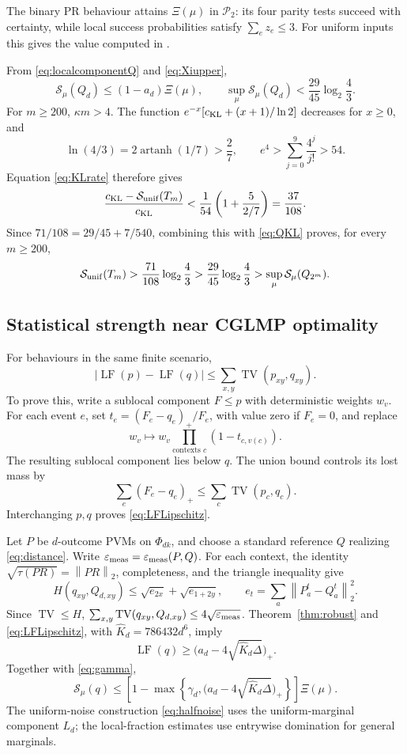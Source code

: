\documentclass[11pt]{amsart}
\theoremstyle{remark}
\theoremstyle{plain}
\numberwithin{equation}{section}
\DeclareMathOperator{\LF}{LF}
\DeclareMathOperator{\TV}{TV}
\DeclareMathOperator{\artanh}{artanh}
\newcommand{\NS}{\mathcal P}
\newcommand{\norm}[1]{\left\|#1\right\|}
\newcommand{\cKL}{c_{\rm KL}}
\newcommand{\epsmeas}{\varepsilon_{\rm meas}}
\begin{document}
The binary PR behaviour attains \(\Xi(\mu)\) in \(\NS_2\):
its four parity tests succeed with certainty, while local success
probabilities satisfy \(\sum_ez_e\le3\).
For uniform inputs this gives the value computed in \cite{Grudka}.

From \eqref{eq:localcomponentQ} and \eqref{eq:Xiupper},
\begin{equation}\label{eq:QKL}
 \mathcal S_\mu(Q_d)\le(1-a_d)\Xi(\mu),\qquad
 \sup_\mu\mathcal S_\mu(Q_d)<\frac{29}{45}\log_2\frac43.
\end{equation}
For \(m\ge200\), \(\kappa m>4\).
The function \(e^{-x}[\cKL+(x+1)/\ln2]\) decreases for \(x\ge0\), and
\[
 \ln(4/3)=2\artanh(1/7)>\frac27,\qquad
 e^4>\sum_{j=0}^9\frac{4^j}{j!}>54.
\]
Equation \eqref{eq:KLrate} therefore gives
\[
 \frac{\cKL-\mathcal S_{\rm unif}(T_m)}{\cKL}
 <\frac1{54}\left(1+\frac5{2/7}\right)=\frac{37}{108}.
\]
Since \(71/108=29/45+7/540\), combining this with \eqref{eq:QKL}
proves, for every \(m\ge200\),
\begin{equation}\label{eq:KLseparation}
 \mathcal S_{\rm unif}(T_m)>
 \frac{71}{108}\log_2\frac43>
 \frac{29}{45}\log_2\frac43>
 \sup_\mu\mathcal S_\mu(Q_{2^m}).
\end{equation}

\subsection{Statistical strength near CGLMP optimality}

For behaviours in the same finite scenario,
\begin{equation}\label{eq:LFLipschitz}
 |\LF(p)-\LF(q)|\le\sum_{x,y}\TV(p_{xy},q_{xy}).
\end{equation}
To prove this, write a sublocal component \(F\le p\) with deterministic
weights \(w_v\). For each event \(e\), set
\(t_e=(F_e-q_e)_+/F_e\), with value zero if \(F_e=0\), and replace
\[
 w_v\longmapsto
 w_v\prod_{\text{contexts }c}(1-t_{c,v(c)}).
\]
The resulting sublocal component lies below \(q\).
The union bound controls its lost mass by
\[
 \sum_e(F_e-q_e)_+\le\sum_c\TV(p_c,q_c).
\]
Interchanging \(p,q\) proves \eqref{eq:LFLipschitz}.

Let \(P\) be \(d\)-outcome PVMs on \(\Phi_{dk}\), and choose a standard
reference \(Q\) realizing \eqref{eq:distance}.
Write \(\epsmeas=\epsmeas(P,Q)\).
For each context, the identity
\(\sqrt{\tau(PR)}=\norm{PR}_2\), completeness, and the triangle
inequality give
\[
 H(q_{xy},Q_{d,xy})\le\sqrt{e_{2x}}+\sqrt{e_{1+2y}},
 \qquad e_t=\sum_a\norm{P^t_a-Q^t_a}_2^2.
\]
Since \(\TV\le H\),
\(\sum_{x,y}\TV(q_{xy},Q_{d,xy})\le4\sqrt{\epsmeas}\).
Theorem~\ref{thm:robust} and \eqref{eq:LFLipschitz}, with
\(\widehat K_d=786432d^6\), imply
\[
 \LF(q)\ge
 \bigl(a_d-4\sqrt{\widehat K_d\Delta}\bigr)_+.
\]
Together with \eqref{eq:gamma},
\begin{equation}\label{eq:KLtradeoff}
 \mathcal S_\mu(q)\le
 \left[
 1-\max\left\{\gamma_d,
       \bigl(a_d-4\sqrt{\widehat K_d\Delta}\bigr)_+\right\}
 \right]\Xi(\mu).
\end{equation}
The uniform-noise construction \eqref{eq:halfnoise} uses the
uniform-marginal component \(L_d\); the local-fraction estimates use
entrywise domination for general marginals.
\end{document}
